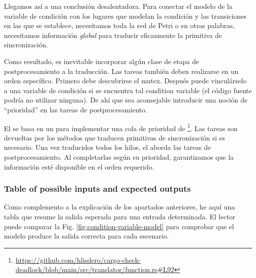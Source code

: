 Llegamos así a una conclusión desalentadora. Para conectar el modelo de la variable de
condición con los lugares que modelan la condición y las transiciones en las que se establece,
necesitamos toda la red de Petri o en otras palabras, necesitamos información \emph{global} para traducir eficazmente la
primitiva de sincronización.

Como resultado, es inevitable incorporar algún clase de etapa de postprocesamiento a la
traducción. Las tareas también deben realizarse en un orden específico. Primero debe
descubrirse el mutex. Después puede vinculárselo a una variable de condición si se encuentra tal
condition variable (el código fuente podría no utilizar ninguna).
De ahí que sea aconsejable introducir una noción de ``prioridad'' en las tareas de postprocesamiento.

El  se basa en un 
para implementar una cola de prioridad de
\footnote{\url{https://github.com/hlisdero/cargo-check-deadlock/blob/main/src/translator/function.rs\#L92}}.
Las tareas son devueltas por los métodos que traducen
primitivas de sincronización si es necesario. Una vez traducidos todos los hilos, el 
aborda las tareas de postprocesamiento. Al completarlas según su prioridad,
garantizamos que la información esté disponible en el orden requerido.

\subsubsection{Table of possible inputs and expected outputs}

Como complemento a la explicación de los apartados anteriores, he aquí una tabla que
resume la salida esperada para una entrada determinada.
El lector puede comparar la Fig. \ref{fig:condition-variable-model}
para comprobar que el modelo produce la salida correcta para cada escenario.

